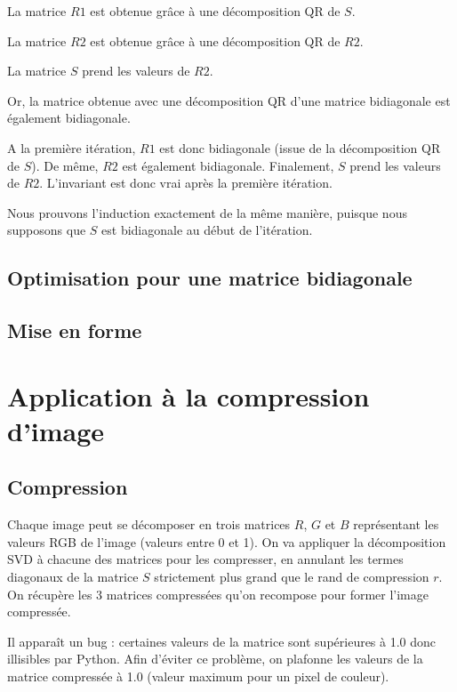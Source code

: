 \documentclass{article}
\begin{document}
\noindent La matrice $R1$ est obtenue grâce à une décomposition QR de $S$.

\noindent La matrice $R2$ est obtenue grâce à une décomposition QR de $R2$.

\noindent La matrice $S$ prend les valeurs de $R2$.

\smallskip
Or, la matrice obtenue avec une décomposition QR d'une matrice bidiagonale est également bidiagonale. %

A la première itération, $R1$ est donc bidiagonale (issue de la décomposition QR de $S$). De même, $R2$ est également bidiagonale. Finalement, $S$ prend les valeurs de $R2$. L'invariant est donc vrai après la première itération.

\smallskip

Nous prouvons l'induction exactement de la même manière, puisque nous supposons que $S$ est bidiagonale au début de l'itération.

\subsection{Optimisation pour une matrice bidiagonale}
\label{ssec:opti_bidiag_qr}

\subsection{Mise en forme}
\label{ssec:mise_en_forme_qr}


\section{Application à la compression d'image}
\label{sec:appli_compr_img}

\subsection{Compression}
\label{ssec:compr_img}

Chaque image peut se décomposer en trois matrices $R$, $G$ et $B$ représentant les valeurs RGB de l'image (valeurs entre 0 et 1).
On va appliquer la décomposition SVD à chacune des matrices pour les compresser, en annulant les termes diagonaux
de la matrice $S$ strictement plus grand que le rand de compression $r$. On récupère les 3 matrices compressées qu'on
recompose pour former l'image compressée. 

Il apparaît un bug : certaines valeurs de la matrice sont supérieures à 1.0 donc illisibles par Python. 
Afin d'éviter ce problème, on plafonne les valeurs de la matrice compressée à 1.0 (valeur maximum pour un pixel de couleur).
\end{document}
